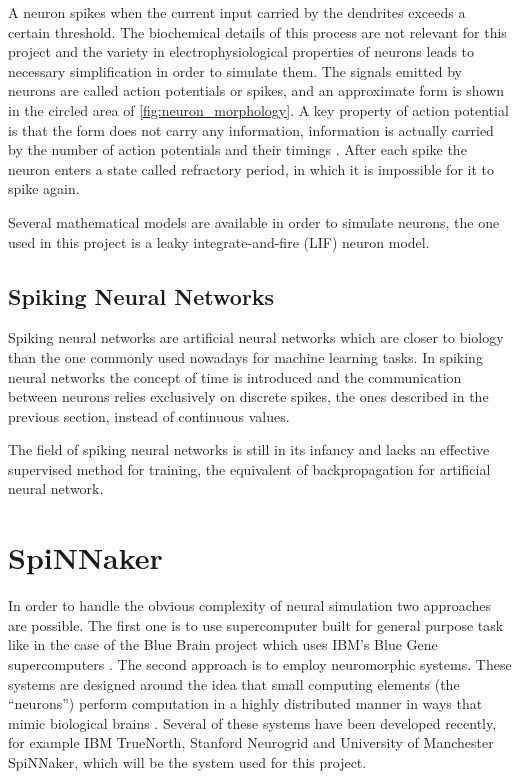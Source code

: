 A neuron spikes when the current input carried by the dendrites exceeds a certain threshold. The biochemical details of this process are not relevant for this project and the variety in electrophysiological properties of neurons \cite{Llinas:2008} leads to necessary simplification in order to simulate them. The signals emitted by neurons are called action potentials or spikes, and an approximate form is shown in the circled area of  \cref{fig:neuron_morphology}. A key property of action potential is that the form does not carry any information, information is actually carried by the number of action potentials and their timings \cite{Gerstner:2014}. After each spike the neuron enters a state called refractory period, in which it is impossible for it to spike again.  

Several mathematical models are available in order to simulate neurons, the one used in this project is a leaky integrate-and-fire (LIF) neuron model. 


\subsection{Spiking Neural Networks}
Spiking neural networks are artificial neural networks which are closer to biology than the one commonly used nowadays for machine learning tasks. In spiking neural networks the concept of time is introduced and the communication between neurons relies exclusively on discrete spikes, the ones described in the previous section, instead of continuous values. 

The field of spiking neural networks is still in its infancy and lacks an effective supervised method for training, the equivalent of backpropagation for artificial neural network.


\section{SpiNNaker}
In order to handle the obvious complexity of neural simulation two approaches are possible. The first one is to use supercomputer built for general purpose task like in the case of the Blue Brain project which uses IBM's Blue Gene supercomputers \cite{Markram2006}. The second approach is to employ neuromorphic systems. These systems are designed around the idea that small computing elements (the ``neurons'') perform computation in a highly distributed manner in ways that mimic biological brains \cite{Furber2016}. Several of these systems have been developed recently, for example IBM TrueNorth, Stanford Neurogrid and University of Manchester SpiNNaker, which will be the system used for this project.

